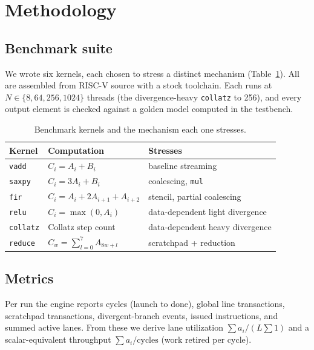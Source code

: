 \documentclass[conference]{IEEEtran}
\begin{document}
\section{Methodology}\label{sec:method}
\subsection{Benchmark suite}
We wrote six kernels, each chosen to stress a distinct mechanism
(Table~\ref{tab:kernels}). All are assembled from RISC-V source with a stock
toolchain. Each runs at $N\in\{8,64,256,1024\}$ threads (the divergence-heavy
\texttt{collatz} to 256), and every output element is checked against a golden
model computed in the testbench.

\begin{table}[t]
\caption{Benchmark kernels and the mechanism each one stresses.}
\label{tab:kernels}
\centering
\footnotesize
\begin{tabular}{lll}
\toprule
Kernel & Computation & Stresses\\
\midrule
\texttt{vadd}    & $C_i=A_i+B_i$                  & baseline streaming\\
\texttt{saxpy}   & $C_i=3A_i+B_i$                 & coalescing, \texttt{mul}\\
\texttt{fir}     & $C_i=A_i+2A_{i+1}+A_{i+2}$     & stencil, partial coalescing\\
\texttt{relu}    & $C_i=\max(0,A_i)$              & data-dependent light divergence\\
\texttt{collatz} & Collatz step count            & data-dependent heavy divergence\\
\texttt{reduce}  & $C_w=\sum_{l=0}^{7}A_{8w+l}$   & scratchpad + reduction\\
\bottomrule
\end{tabular}
\end{table}

\subsection{Metrics}
Per run the engine reports cycles (launch to done), global line transactions,
scratchpad transactions, divergent-branch events, issued instructions, and
summed active lanes. From these we derive lane utilization
$\sum a_i/(L\sum 1)$ and a scalar-equivalent throughput
$\sum a_i/\text{cycles}$ (work retired per cycle).
\end{document}
